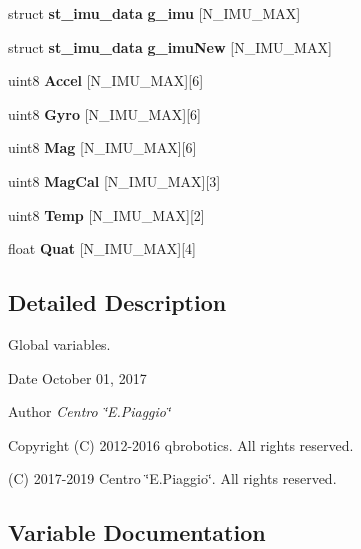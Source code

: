 \begin{DoxyCompactItemize}
\mbox{\label{globals_8c_ab72cce926a6439eda41315f45a9c379c}} 
struct \textbf{ st\+\_\+imu\+\_\+data} {\bfseries g\+\_\+imu} [N\+\_\+\+I\+M\+U\+\_\+\+M\+AX]
\item 
\mbox{\label{globals_8c_abb00fd907d732c0691940f718e231178}} 
struct \textbf{ st\+\_\+imu\+\_\+data} {\bfseries g\+\_\+imu\+New} [N\+\_\+\+I\+M\+U\+\_\+\+M\+AX]
\item 
\mbox{\label{globals_8c_a187c605f3898cf11e09f6f469c265920}} 
uint8 {\bfseries Accel} [N\+\_\+\+I\+M\+U\+\_\+\+M\+AX][6]
\item 
\mbox{\label{globals_8c_a49dba88a31d1b3b4190065b9ef1649fe}} 
uint8 {\bfseries Gyro} [N\+\_\+\+I\+M\+U\+\_\+\+M\+AX][6]
\item 
\mbox{\label{globals_8c_a5d88408ccb73729f049a52b4d1daaadf}} 
uint8 {\bfseries Mag} [N\+\_\+\+I\+M\+U\+\_\+\+M\+AX][6]
\item 
\mbox{\label{globals_8c_a1e598e1bdae5fe927fbd1f396161f3a6}} 
uint8 {\bfseries Mag\+Cal} [N\+\_\+\+I\+M\+U\+\_\+\+M\+AX][3]
\item 
\mbox{\label{globals_8c_af5f2d49e123a057d358297a34194ebdc}} 
uint8 {\bfseries Temp} [N\+\_\+\+I\+M\+U\+\_\+\+M\+AX][2]
\item 
\mbox{\label{globals_8c_a79179edea7394e7176f8768b1b0f6f92}} 
float {\bfseries Quat} [N\+\_\+\+I\+M\+U\+\_\+\+M\+AX][4]
\end{DoxyCompactItemize}


\subsection{Detailed Description}
Global variables. 

\begin{DoxyDate}{Date}
October 01, 2017 
\end{DoxyDate}
\begin{DoxyAuthor}{Author}
{\itshape Centro \char`\"{}\+E.\+Piaggio\char`\"{}} 
\end{DoxyAuthor}
\begin{DoxyCopyright}{Copyright}
(C) 2012-\/2016 qbrobotics. All rights reserved. 

(C) 2017-\/2019 Centro \char`\"{}\+E.\+Piaggio\char`\"{}. All rights reserved. 
\end{DoxyCopyright}


\subsection{Variable Documentation}
\mbox{\label{globals_8c_ab4765549a3f6990d35f3d0740263b254}} 
